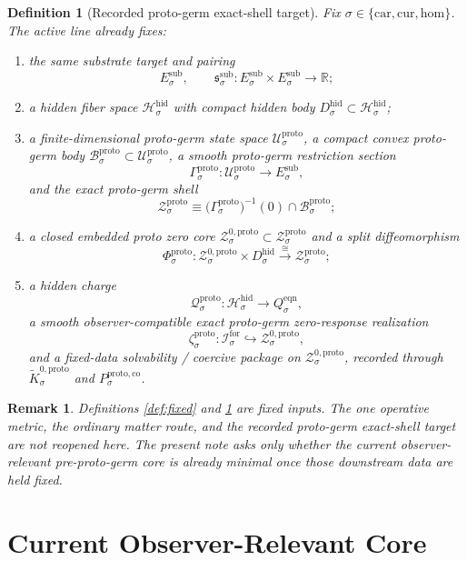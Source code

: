 \documentclass[11pt]{article}
\newcommand{\Car}{\mathrm{car}}
\newcommand{\Cur}{\mathrm{cur}}
\newcommand{\Hom}{\mathrm{hom}}
\newcommand{\ForSpace}[1]{\mathcal I_{#1}^{\mathrm{for}}}
\newcommand{\SubTarget}[1]{E_{#1}^{\mathrm{sub}}}
\newcommand{\SubPair}[1]{\mathfrak s_{#1}^{\mathrm{sub}}}
\newcommand{\EqnTarget}[1]{Q_{#1}^{\mathrm{eqn}}}
\newcommand{\HiddenSpace}[1]{\mathcal H_{#1}^{\mathrm{hid}}}
\newcommand{\HiddenBody}[1]{D_{#1}^{\mathrm{hid}}}
\newcommand{\ProtoSpace}[1]{\mathcal U_{#1}^{\mathrm{proto}}}
\newcommand{\ProtoBody}[1]{\mathcal B_{#1}^{\mathrm{proto}}}
\newcommand{\ProtoSection}[1]{\Gamma_{#1}^{\mathrm{proto}}}
\newcommand{\ProtoShellSet}[1]{\mathcal Z_{#1}^{\mathrm{proto}}}
\newcommand{\ProtoZeroCore}[1]{\mathcal Z_{#1}^{0,\mathrm{proto}}}
\newcommand{\ProtoSplit}[1]{\Phi_{#1}^{\mathrm{proto}}}
\newcommand{\ProtoCharge}[1]{\mathcal Q_{#1}^{\mathrm{proto}}}
\newcommand{\ProtoEmbed}[1]{\zeta_{#1}^{\mathrm{proto}}}
\newcommand{\ProtoKernelCh}[1]{\widetilde K_{#1}^{0,\mathrm{proto}}}
\newcommand{\ProtoStateComp}[1]{P_{#1}^{\mathrm{proto,co}}}
\newtheorem{definition}{Definition}
\newtheorem{remark}{Remark}
\begin{document}
\begin{definition}[Recorded proto-germ exact-shell target]
\label{def:proto}
Fix \(\sigma\in\{\Car,\Cur,\Hom\}\). The active line already fixes:
\begin{enumerate}
    \item the same substrate target and pairing
    \[
    \SubTarget{\sigma},
    \qquad
    \SubPair{\sigma}:
    \SubTarget{\sigma}\times\SubTarget{\sigma}\to\mathbb R;
    \]
    \item a hidden fiber space \(\HiddenSpace{\sigma}\) with compact hidden body \(\HiddenBody{\sigma}\subset\HiddenSpace{\sigma}\);
    \item a finite-dimensional proto-germ state space \(\ProtoSpace{\sigma}\), a compact convex proto-germ body \(\ProtoBody{\sigma}\subset\ProtoSpace{\sigma}\), a smooth proto-germ restriction section
    \[
    \ProtoSection{\sigma}:\ProtoSpace{\sigma}\to\SubTarget{\sigma},
    \]
    and the exact proto-germ shell
    \[
    \ProtoShellSet{\sigma}
    \equiv
    \bigl(\ProtoSection{\sigma}\bigr)^{-1}(0)\cap\ProtoBody{\sigma};
    \]
    \item a closed embedded proto zero core \(\ProtoZeroCore{\sigma}\subset\ProtoShellSet{\sigma}\) and a split diffeomorphism
    \[
    \ProtoSplit{\sigma}:
    \ProtoZeroCore{\sigma}\times\HiddenBody{\sigma}
    \xrightarrow{\cong}
    \ProtoShellSet{\sigma};
    \]
    \item a hidden charge
    \[
    \ProtoCharge{\sigma}:\HiddenSpace{\sigma}\to\EqnTarget{\sigma},
    \]
    a smooth observer-compatible exact proto-germ zero-response realization
    \[
    \ProtoEmbed{\sigma}:\ForSpace{\sigma}\hookrightarrow\ProtoZeroCore{\sigma},
    \]
    and a fixed-data solvability / coercive package on \(\ProtoZeroCore{\sigma}\), recorded through \(\ProtoKernelCh{\sigma}\) and \(\ProtoStateComp{\sigma}\).
\end{enumerate}
\end{definition}

\begin{remark}
Definitions \ref{def:fixed} and \ref{def:proto} are fixed inputs. The one operative metric, the ordinary matter route, and the recorded proto-germ exact-shell target are not reopened here. The present note asks only whether the current observer-relevant pre-proto-germ core is already minimal once those downstream data are held fixed.
\end{remark}

\section{Current Observer-Relevant Core}
\end{document}
